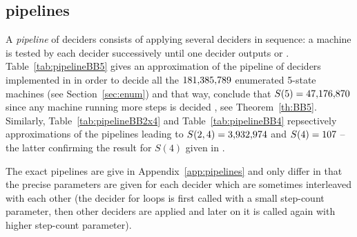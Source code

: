 \subsection{\CoqBB pipelines}\label{sec:pipelines}
A \textit{pipeline} of deciders consists of applying several deciders in sequence: a machine is tested by each decider successively until one decider outputs \HALT or \NONHALT. Table~\ref{tab:pipelineBB5} gives an approximation of the pipeline of deciders implemented in \CoqBB in order to decide all the $181{,}385{,}789$ enumerated 5-state machines (see Section~\ref{sec:enum}) and that way, conclude that $S(5) = 47{,}176{,}870$ since any machine running more steps is decided \NONHALT, see Theorem~\ref{th:BB5}. Similarly, Table~\ref{tab:pipelineBB2x4} and Table~\ref{tab:pipelineBB4} repsectively approximations of the pipelines leading to $S(2,4) = 3{,}932{,}974$ and $S(4) = 107$ -- the latter confirming the result for $S(4)$ given in \cite{Brady83}.

The exact pipelines are give in Appendix~\ref{app:pipelines} and only differ in that the precise parameters are given for each decider which are sometimes interleaved with each other (\eg the decider for loops is first called with a small step-count parameter, then other deciders are applied and later on it is called again with higher step-count parameter).


